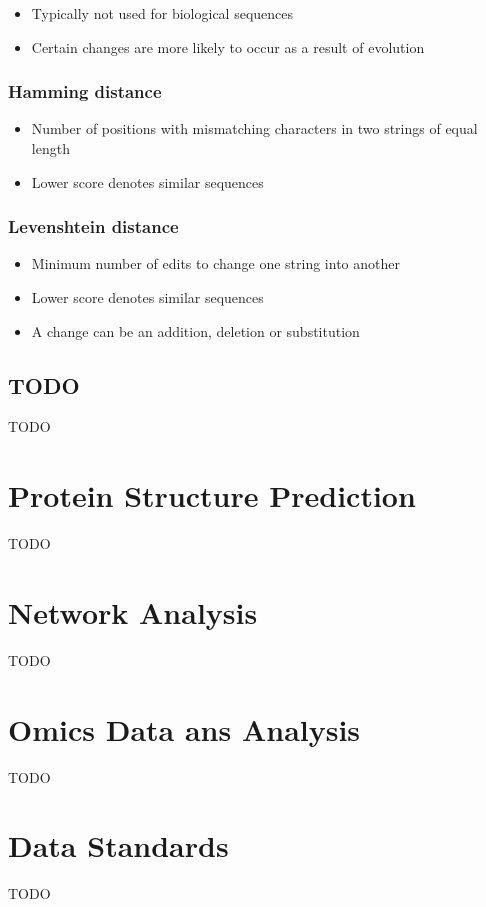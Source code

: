 \documentclass[a4paper]{article}
\begin{document}
\begin{itemize}
  \item Typically not used for biological sequences
  \item Certain changes are more likely to occur as a result of evolution
\end{itemize}

\subsubsection{Hamming distance}

\begin{itemize}
  \item Number of positions with mismatching characters in two strings of equal
        length
  \item Lower score denotes similar sequences
\end{itemize}

\subsubsection{Levenshtein distance}

\begin{itemize}
  \item Minimum number of edits to change one string into another
  \item Lower score denotes similar sequences
  \item A change can be an addition, deletion or substitution
\end{itemize}

\subsection{TODO}

TODO

\section{Protein Structure Prediction}

TODO

\section{Network Analysis}

TODO

\section{Omics Data ans Analysis}

TODO

\section{Data Standards}

TODO
\end{document}
